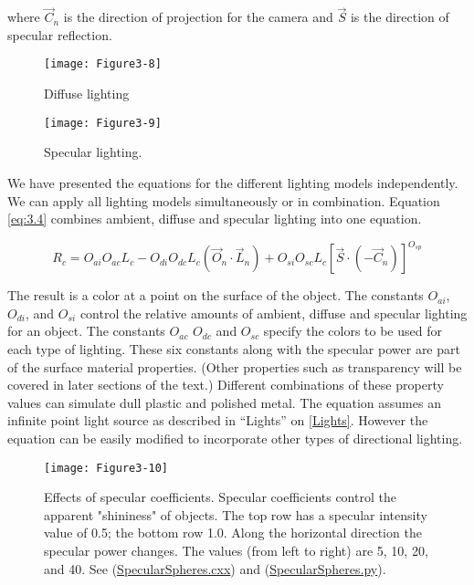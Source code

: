\noindent where $\overrightarrow{C}_n$ is the direction of projection for the camera and $\overrightarrow{S}$ is the direction of specular reflection.

\begin{figure}[!htb]
  \centering
  \texttt{[image: Figure3-8]}\\
  \caption{Diffuse lighting}\label{fig:Figure3-8}
\end{figure}

\begin{figure}[!htb]
  \centering
  \texttt{[image: Figure3-9]}\\
  \caption{Specular lighting.}\label{fig:Figure3-9}
\end{figure}

We have presented the equations for the different lighting models independently. We can apply all lighting models simultaneously or in combination. Equation \ref{eq:3.4} combines ambient, diffuse and specular lighting into one equation.

\begin{equation}\label{eq:3.4}
  R_c = O_{ai}O_{ac}L_c - O_{di}O_{dc}L_c(\overrightarrow{O}_n \cdot \overrightarrow{L}_n) + O_{si}O_{sc}L_c[\overrightarrow{S} \cdot(-\overrightarrow{C}_n)]^{O_{sp}}
\end{equation}


The result is a color at a point on the surface of the object. The constants $O_{ai}$, $O_{di}$, and $O_{si}$ control the relative amounts of ambient, diffuse and specular lighting for an object. The constants $O_{ac}$ $O_{dc}$ and $O_{sc}$ specify the colors to be used for each type of lighting. These six constants along with the specular power are part of the surface material properties. (Other properties such as transparency will be covered in later sections of the text.) Different combinations of these property values can simulate dull plastic and polished metal. The equation assumes an infinite point light source as described in ``Lights'' on \ref{Lights}. However the equation can be easily modified to incorporate other types of directional lighting.

\begin{figure}[!htb]
  \centering
  \texttt{[image: Figure3-10]}\\
  \caption{Effects of specular coefficients. Specular coefficients control the apparent "shininess" of objects. The top row has a specular intensity value of 0.5; the bottom row 1.0. Along the horizontal direction the specular power changes. The values (from left to right) are 5, 10, 20, and 40. See (\href{https://lorensen.github.io/VTKExamples/site/Cxx/Rendering/SpecularSpheres/}{SpecularSpheres.cxx}) and (\href{https://lorensen.github.io/VTKExamples/site/Python/Rendering/SpecularSpheres/}{SpecularSpheres.py}).}\label{fig:Figure3-10}
\end{figure}

